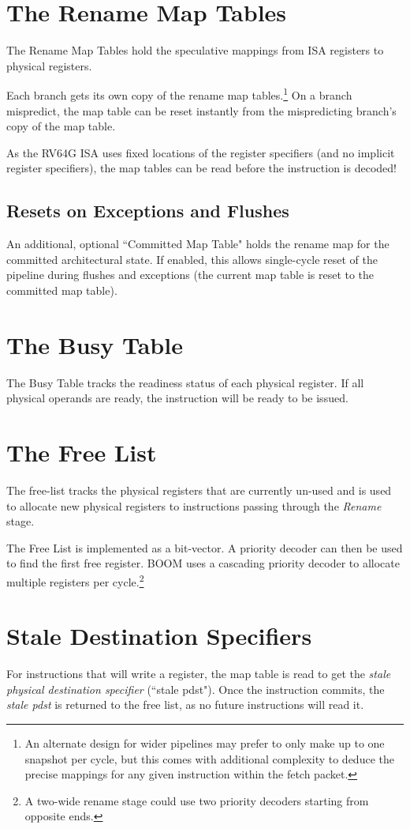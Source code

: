 \section{The Rename Map Tables}

The Rename Map Tables hold the speculative mappings from ISA registers to physical registers.  

Each branch gets its own copy of the rename map tables.\footnote{An alternate design for wider pipelines may prefer to only make up to one snapshot per cycle, but this comes with additional complexity to deduce the precise mappings for any given instruction within the fetch packet.}  On a branch mispredict, the map table can be reset instantly from the mispredicting branch's copy of the map table. 

As the RV64G ISA uses fixed locations of the register specifiers (and no implicit register specifiers), the map tables can be read before the instruction is decoded!  

\subsection{Resets on Exceptions and Flushes}


An additional, optional ``Committed Map Table" holds the rename map for the committed architectural state.  If enabled, this allows single-cycle reset of the pipeline during flushes and exceptions (the current map table is reset to the committed map table). 


\section{The Busy Table}

The Busy Table tracks the readiness status of each physical register. If all physical operands are ready, the instruction will be ready to be issued. 

\section{The Free List}

The free-list tracks the physical registers that are currently un-used and is used to allocate new physical registers to instructions passing through the {\em Rename} stage.  

The Free List is implemented as a bit-vector.  A priority decoder can then be used to find the first free register. BOOM uses a cascading priority decoder to allocate multiple registers per cycle.\footnote{A two-wide rename stage could use two priority decoders starting from opposite ends.}

\section{Stale Destination Specifiers}

For instructions that will write a register, the map table is read to get the {\em stale physical destination specifier} (``stale pdst").  Once the instruction commits, the {\em stale pdst} is returned to the free list, as no future instructions will read it.